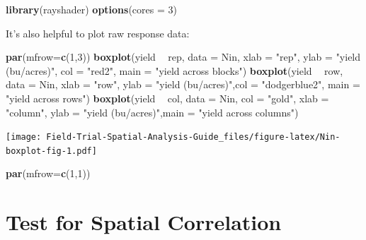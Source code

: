 \documentclass[]{book}
\newenvironment{Shaded}{\begin{snugshade}}{\end{snugshade}}
\newcommand{\DataTypeTok}[1]{\textcolor[rgb]{0.13,0.29,0.53}{#1}}
\newcommand{\DecValTok}[1]{\textcolor[rgb]{0.00,0.00,0.81}{#1}}
\newcommand{\KeywordTok}[1]{\textcolor[rgb]{0.13,0.29,0.53}{\textbf{#1}}}
\newcommand{\NormalTok}[1]{#1}
\newcommand{\OperatorTok}[1]{\textcolor[rgb]{0.81,0.36,0.00}{\textbf{#1}}}
\newcommand{\StringTok}[1]{\textcolor[rgb]{0.31,0.60,0.02}{#1}}
\begin{document}
\begin{Shaded}
\begin{Highlighting}[]
\KeywordTok{library}\NormalTok{(rayshader)}
\KeywordTok{options}\NormalTok{(}\DataTypeTok{cores =} \DecValTok{3}\NormalTok{)}
\end{Highlighting}
\end{Shaded}

It's also helpful to plot raw response data:

\begin{Shaded}
\begin{Highlighting}[]
\KeywordTok{par}\NormalTok{(}\DataTypeTok{mfrow=}\KeywordTok{c}\NormalTok{(}\DecValTok{1}\NormalTok{,}\DecValTok{3}\NormalTok{))}
\KeywordTok{boxplot}\NormalTok{(yield }\OperatorTok{~}\StringTok{ }\NormalTok{rep, }\DataTypeTok{data =}\NormalTok{ Nin, }\DataTypeTok{xlab =} \StringTok{"rep"}\NormalTok{, }\DataTypeTok{ylab =} \StringTok{"yield (bu/acres)"}\NormalTok{, }\DataTypeTok{col =} \StringTok{"red2"}\NormalTok{, }\DataTypeTok{main =} \StringTok{"yield across blocks"}\NormalTok{)}
\KeywordTok{boxplot}\NormalTok{(yield }\OperatorTok{~}\StringTok{ }\NormalTok{row, }\DataTypeTok{data =}\NormalTok{ Nin, }\DataTypeTok{xlab =} \StringTok{"row"}\NormalTok{, }\DataTypeTok{ylab =} \StringTok{"yield (bu/acres)"}\NormalTok{,}\DataTypeTok{col =} \StringTok{"dodgerblue2"}\NormalTok{, }\DataTypeTok{main =} \StringTok{"yield across rows"}\NormalTok{)}
\KeywordTok{boxplot}\NormalTok{(yield }\OperatorTok{~}\StringTok{ }\NormalTok{col, }\DataTypeTok{data =}\NormalTok{ Nin, }\DataTypeTok{col =} \StringTok{"gold"}\NormalTok{, }\DataTypeTok{xlab =} \StringTok{"column"}\NormalTok{, }\DataTypeTok{ylab =} \StringTok{"yield (bu/acres)"}\NormalTok{,}\DataTypeTok{main =} \StringTok{"yield across columns"}\NormalTok{)}
\end{Highlighting}
\end{Shaded}

\texttt{[image: Field-Trial-Spatial-Analysis-Guide\_files/figure-latex/Nin-boxplot-fig-1.pdf]}

\begin{Shaded}
\begin{Highlighting}[]
\KeywordTok{par}\NormalTok{(}\DataTypeTok{mfrow=}\KeywordTok{c}\NormalTok{(}\DecValTok{1}\NormalTok{,}\DecValTok{1}\NormalTok{))}
\end{Highlighting}
\end{Shaded}

\hypertarget{test-for-spatial-correlation}{%
\section{Test for Spatial Correlation}\label{test-for-spatial-correlation}}
\end{document}
